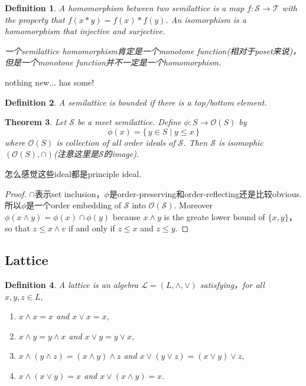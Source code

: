 \documentclass{article}
\newtheorem{theorem}{Theorem}[section]
\newtheorem{definition}[theorem]{Definition}
\newcommand*{\xfunc}[4]{{#2}\colon{#3}{#1}{#4}}
\newcommand*{\func}[3]{\xfunc{\to}{#1}{#2}{#3}}
\newcommand\Set[2]{\{\,#1\mid#2\,\}} %
\newcommand\slattice{\mathcal{S}}
\newcommand\lattice{\mathcal{L}}
\begin{document}
\begin{definition}\rm A {\color{red} homomorphism} between two semilattice is a map $\func{f}{\slattice}{\mathcal{T}}$ with the property that $f(x*y) = f(x) * f(y)$. An {\color{red} isomorphism} is a homomorphism that injective and surjective.

{\color{red} 一个semilattice homomorphism肯定是一个monotone function(相对于poset来说)，但是一个monotone function并不一定是一个homomorphism}.
\end{definition}

{\color{blue} nothing new}... {\color{red} has some!}

\begin{definition}
\rm A semilattice is {\color{red} bounded} if there is a top/bottom element. 
\end{definition}



\begin{theorem}
\rm Let $\slattice$ be a meet semilattice. Define $\func{\phi}{S}{\mathcal{O}(S)}$ by
$$
\phi(x) = \Set{y \in S}{y \leq x}
$$
where $\mathcal{O}(S)$ is collection of all order ideals of $\slattice$. Then $\slattice$ is isomophic $(\mathcal{O}(S),\cap)$(注意这里是$\slattice$的image).
\end{theorem}

{\color{blue} 怎么感觉这些ideal都是principle ideal}.

\begin{proof}
$\cap$表示set inclusion，$\phi$是order-preserving和order-reflecting还是比较obvious. 所以$\phi$是一个order embedding of $\slattice$ into $\mathcal{O}(\slattice)$. Moreover $\phi(x \wedge y) = \phi(x) \cap \phi(y)$ because $x \wedge y$ is the greate lower bound of $\{x,y\}$，so that $z \leq x \wedge v$ if and only if $z \leq x$ and $z \leq y$. 
\end{proof}


\newpage
\subsection{Lattice}
\begin{definition}
\rm A {\color{red} lattice} is an algebra $\lattice = (L,\wedge,\vee)$ satisfying，for all $x,y,z \in L,$
\begin{enumerate}
	\item $x \wedge x = x$ and $x \vee x = x,$
	\item $x \wedge y = y \wedge x$ and $x \vee y = y \vee x,$
	\item $x \wedge (y \wedge z) = (x \wedge y) \wedge z$ and $x \vee (y \vee z) = (x \vee y) \vee z,$
	\item $x \wedge (x \vee y) = x$ and $x \vee (x \wedge y) = x.$ 
\end{enumerate}
\end{definition}
\end{document}
